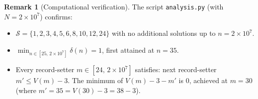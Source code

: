 \documentclass[12pt]{article}
\theoremstyle{plain}
\theoremstyle{definition}
\newtheorem{remark}[theorem]{Remark}
\begin{document}
\begin{remark}[Computational verification]
  The script \texttt{analysis.py} (with $N = 2\times 10^7$) confirms:
  \begin{itemize}
    \item $\mathcal{S} = \{1,2,3,4,5,6,8,10,12,24\}$ with no additional solutions up to $n = 2\times 10^7$.
    \item $\min_{n \in [25,\, 2\times 10^7]} \delta(n) = 1$, first attained at $n = 35$.
    \item Every record-setter $m \in [24,\, 2\times 10^7]$ satisfies: next record-setter $m' \leq V(m) - 3$.
      The minimum of $V(m) - 3 - m'$ is $0$, achieved at $m = 30$ (where $m' = 35 = V(30)-3 = 38-3$).
  \end{itemize}
\end{remark}
\end{document}
